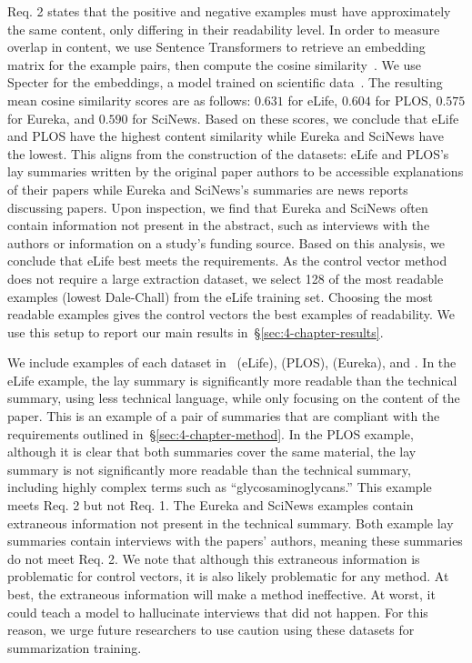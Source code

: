 Req. 2 states that the positive and negative examples must have approximately the same content, only differing in their readability level. In order to measure overlap in content, we use Sentence Transformers to retrieve an embedding matrix for the example pairs, then compute the cosine similarity~\cite{reimers-gurevych-2019-sentence}. We use Specter for the embeddings, a model trained on scientific data~\cite{cohan-etal-2020-specter}. The resulting mean cosine similarity scores are as follows: $0.631$ for eLife, $0.604$ for PLOS, $0.575$ for Eureka, and $0.590$ for SciNews. Based on these scores, we conclude that eLife and PLOS have the highest content similarity while Eureka and SciNews have the lowest. This aligns from the construction of the datasets: eLife and PLOS's lay summaries written by the original paper authors to be accessible explanations of their papers while Eureka and SciNews's summaries are news reports discussing papers. Upon inspection, we find that Eureka and SciNews often contain information not present in the abstract, such as interviews with the authors or information on a study's funding source. 
Based on this analysis, we conclude that eLife best meets the requirements. As the control vector method does not require a large extraction dataset, we select 128 of the most readable examples (lowest Dale-Chall) from the eLife training set. Choosing the most readable examples gives the control vectors the best examples of readability. We use this setup to report our main results in~\S\ref{sec:4-chapter-results}. 




We include examples of each dataset in~ (eLife),  (PLOS),  (Eureka), and . In the eLife example, the lay summary is significantly more readable than the technical summary, using less technical language, while only focusing on the content of the paper. This is an example of a pair of summaries that are compliant with the requirements outlined in~\S\ref{sec:4-chapter-method}. In the PLOS example, although it is clear that both summaries cover the same material, the lay summary is not significantly more readable than the technical summary, including highly complex terms such as ``glycosaminoglycans.'' This example meets Req. 2 but not Req. 1. The Eureka and SciNews examples contain extraneous information not present in the technical summary. Both example lay summaries contain interviews with the papers' authors, meaning these summaries do not meet Req. 2. We note that although this extraneous information is problematic for control vectors, it is also likely problematic for any method. At best, the extraneous information will make a method ineffective. At worst, it could teach a model to hallucinate interviews that did not happen. For this reason, we urge future researchers to use caution using these datasets for summarization training.

